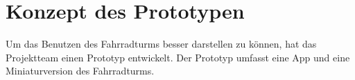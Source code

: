 \section{Konzept des Prototypen}

Um das Benutzen des Fahrradturms besser darstellen zu können, hat das Projektteam einen Prototyp entwickelt. Der Prototyp umfasst eine App und eine Miniaturversion des Fahrradturms.



\clearpage


\clearpage
